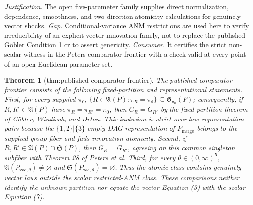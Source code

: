 \documentclass{article}
\newtheorem{theorem}{Theorem}
\begin{document}
\par\smallskip\noindent \textit{Justification.} The open five-parameter family supplies direct normalization, dependence, smoothness, and two-direction atomicity calculations for genuinely vector shocks. \textit{Gap.} Conditional-variance ANM restrictions are used here to verify irreducibility of an explicit vector innovation family, not to replace the published Göbler Condition 1 or to assert genericity. \textit{Consumer.} It certifies the strict non-scalar witness in the Peters comparator frontier with a check valid at every point of an open Euclidean parameter set.

\begin{theorem}[thm:published-comparator-frontier]\label{thm:published-comparator-frontier}
The published comparator frontier consists of the following fixed-partition and representational statements. First, for every supplied \(\pi_0\), \(\{R\in\mathfrak A(P):\pi_R=\pi_0\}\subseteq\mathfrak G_{\pi_0}(P)\); consequently, if \(R,R'\in\mathfrak A(P)\) have \(\pi_R=\pi_{R'}=\pi_0\), then \(G_R=G_{R'}\) by the fixed-partition theorem of Göbler, Windisch, and Drton. This inclusion is strict over law--representation pairs because the \(\{1,2\}|\{3\}\) empty-DAG representation of \(P_{\mathrm{merge}}\) belongs to the supplied-group fiber and fails innovation atomicity. Second, if \(R,R'\in\mathfrak A(P)\cap\mathfrak S(P)\), then \(G_R=G_{R'}\), agreeing on this common singleton subfiber with Theorem 28 of Peters et al. Third, for every \(\theta\in(0,\infty)^5\), \(\mathfrak A(P_{\mathrm{vec},\theta})\neq\varnothing\) and \(\mathfrak S(P_{\mathrm{vec},\theta})=\varnothing\). Thus the atomic class contains genuinely vector laws outside the scalar restricted-ANM class. These comparisons neither identify the unknown partition nor equate the vector Equation (3) with the scalar Equation (7).
\end{theorem}
\end{document}
